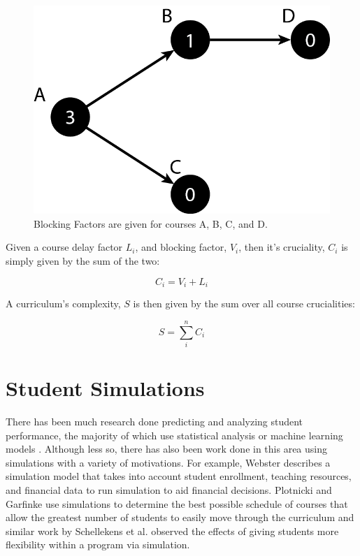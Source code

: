 \documentclass[botnum, fleqn]{unmeethesis}
\begin{document}
    \begin{figure}[h!]
      \centerline{\includegraphics[scale=0.4]{./figures/blocking_factor.png}}
      \caption{Blocking Factors are given for courses A, B, C, and D.} 
      \label{fig:blocking_factor_example}
    \end{figure}

    Given a course delay factor \(L_i\), and blocking factor, \(V_i\), then it's cruciality, \(C_i\) is simply given by the sum of the two:

    \begin{equation}
      C_{i} = V_{i} + L_{i}
    \end{equation}

    A curriculum's complexity, \(S\) is then given by the sum over all course crucialities:

    \begin{equation}
      S = \sum_{i}^n C_{i}
    \end{equation}


  \section{Student Simulations}
    There has been much research done predicting and analyzing student performance, the majority of which use statistical analysis or machine learning models \cite{7008697,6826206,goenner2004predicting}. Although less so, there has also been work done in this area using simulations with a variety of motivations. For example, Webster \cite{10.2307/3444955} describes a simulation model that takes into account student enrollment, teaching resources, and financial data to run simulation to aid financial decisions. Plotnicki and Garfinke \cite{RePEc:eee:soceps:v:20:y:1986:i:4:p:193-199} use simulations to determine the best possible schedule of courses that allow the greatest number of students to easily move through the curriculum and similar work by Schellekens et al. \cite{10.2307/40540244} observed the effects of giving students more flexibility within a program via simulation.
\end{document}
